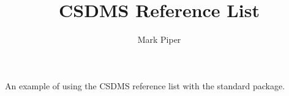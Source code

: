 \documentclass[11pt]{article}
\begin{document}
\title{CSDMS Reference List}
\author{Mark Piper}
\maketitle

An example of using the CSDMS reference list
with the standard \BibTeX package.

\cite{tucker2010modeling}
\cite{overeem2015strategies}
\cite{kettner2008hydrotrend}
\cite{hutton2008sedflux}
\cite{piper2015wmt}
\cite{blanca2017compute}
\cite{jupyter2015notebook}
\cite{gdal2017gdal}


\end{document}
